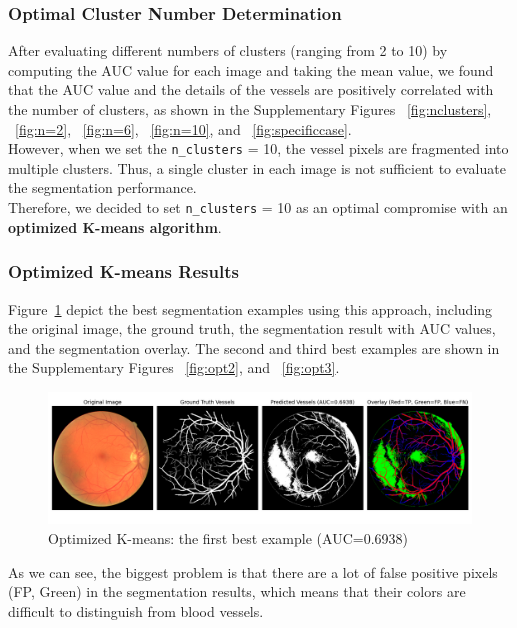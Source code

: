 \documentclass[final]{article}
\begin{document}
\subsubsection{Optimal Cluster Number Determination}
After evaluating different numbers of clusters (ranging from 2 to 10) by computing the AUC value for each image and taking the mean value, we found that the AUC value and the details of the vessels are positively correlated with the number of clusters, as shown in the Supplementary Figures ~\ref{fig:nclusters}, ~\ref{fig:n=2}, ~\ref{fig:n=6}, ~\ref{fig:n=10}, and ~\ref{fig:specificcase}. \\
However, when we set the \texttt{n\_clusters} = 10, the vessel pixels are fragmented into multiple clusters. Thus, a single cluster in each image is not sufficient to evaluate the segmentation performance. \\
Therefore, we decided to set \texttt{n\_clusters} = 10 as an optimal compromise with an \textbf{optimized K-means algorithm}.
\subsubsection{Optimized K-means Results}
Figure~\ref{fig:opt1} depict the best segmentation examples using this approach, including the original image, the ground truth, the segmentation result with AUC values, and the segmentation overlay. The second and third best examples are shown in the Supplementary Figures ~\ref{fig:opt2}, and ~\ref{fig:opt3}. 
\begin{figure}[H]
    \centering
    \includegraphics[scale=0.25]{Figures/3 Optimized 1st.png}
    \vspace{-0.25cm}
    \caption{Optimized K-means: the first best example (AUC=0.6938)}
    \label{fig:opt1}
\end{figure}
As we can see, the biggest problem is that there are a lot of false positive pixels (FP, Green) in the segmentation results, which means that their colors are difficult to distinguish from blood vessels. 
\end{document}
